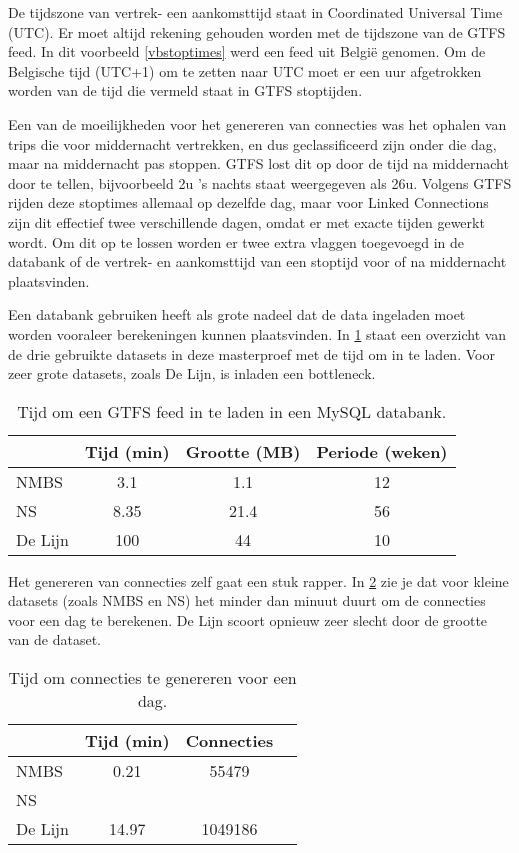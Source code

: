 De tijdszone van vertrek- een aankomsttijd staat in Coordinated Universal Time (UTC). Er moet altijd rekening gehouden worden met de tijdszone van de GTFS feed. In dit voorbeeld \ref{vbstoptimes} werd een feed uit Belgi\"e genomen. Om de Belgische tijd (UTC+1) om te zetten naar UTC moet er een uur afgetrokken worden van de tijd die vermeld staat in GTFS stoptijden.

Een van de moeilijkheden voor het genereren van connecties was het ophalen van trips die voor middernacht vertrekken, en dus geclassificeerd zijn onder die dag, maar na middernacht pas stoppen. GTFS lost dit op door de tijd na middernacht door te tellen, bijvoorbeeld 2u 's nachts staat weergegeven als 26u. Volgens GTFS rijden deze stoptimes allemaal op dezelfde dag, maar voor Linked Connections zijn dit effectief twee verschillende dagen, omdat er met exacte tijden gewerkt wordt.
Om dit op te lossen worden er twee extra vlaggen toegevoegd in de databank of de vertrek- en aankomsttijd van een stoptijd voor of na middernacht plaatsvinden.

Een databank gebruiken heeft als grote nadeel dat de data ingeladen moet worden vooraleer berekeningen kunnen plaatsvinden. In \ref{table:inladengtfs} staat een overzicht van de drie gebruikte datasets in deze masterproef met de tijd om in te laden. Voor zeer grote datasets, zoals De Lijn, is inladen een bottleneck.

\begin{table}[htbp]
\centering
\begin{tabular}{ | l || c | c | c |}
  \hline			
    & Tijd (min) & Grootte (MB) & Periode (weken) \\ \hline
  NMBS & 3.1 & 1.1 & 12  \\
  NS & 8.35 & 21.4 & 56 \\
  De Lijn & 100 & 44 & 10 \\
  \hline  
\end{tabular}
\caption{Tijd om een GTFS feed in te laden in een MySQL databank.}
\label{table:inladengtfs}
\end{table}

Het genereren van connecties zelf gaat een stuk rapper. In \ref{table:connectiesgenereren} zie je dat voor kleine datasets (zoals NMBS en NS) het minder dan minuut duurt om de connecties voor een dag te berekenen. De Lijn scoort opnieuw zeer slecht door de grootte van de dataset.

\begin{table}[htbp]
\centering
\begin{tabular}{ | l || c | c | c |}
  \hline			
    & Tijd (min) & Connecties \\ \hline
  NMBS & 0.21 & 55479 \\
  NS &  &  \\
  De Lijn & 14.97 & 1049186 \\
  \hline  
\end{tabular}
\caption{Tijd om connecties te genereren voor een dag.}
\label{table:connectiesgenereren}
\end{table}

